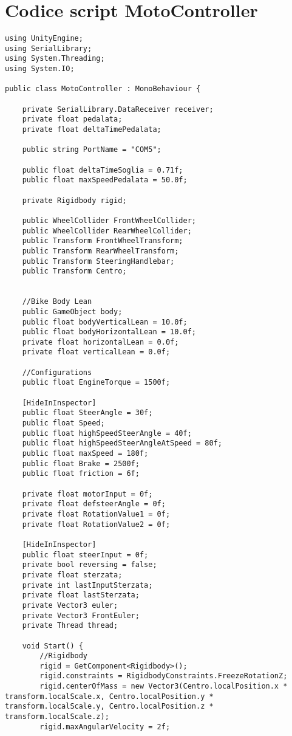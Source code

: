 \chapter{Codice script MotoController}
\label{controller}
\thispagestyle{empty}

\begin{lstlisting}
using UnityEngine;
using SerialLibrary;
using System.Threading;
using System.IO;

public class MotoController : MonoBehaviour {

    private SerialLibrary.DataReceiver receiver;
    private float pedalata;
    private float deltaTimePedalata;

    public string PortName = "COM5";
    
    public float deltaTimeSoglia = 0.71f;
    public float maxSpeedPedalata = 50.0f;

    private Rigidbody rigid;

    public WheelCollider FrontWheelCollider;
    public WheelCollider RearWheelCollider;
    public Transform FrontWheelTransform;
    public Transform RearWheelTransform;
	public Transform SteeringHandlebar;
    public Transform Centro;


    //Bike Body Lean
    public GameObject body;
    public float bodyVerticalLean = 10.0f;
    public float bodyHorizontalLean = 10.0f;
    private float horizontalLean = 0.0f;
    private float verticalLean = 0.0f;

    //Configurations
    public float EngineTorque = 1500f;

	[HideInInspector]
    public float SteerAngle = 30f;
    public float Speed;
    public float highSpeedSteerAngle = 40f;
    public float highSpeedSteerAngleAtSpeed = 80f;
    public float maxSpeed = 180f;
    public float Brake = 2500f;
    public float friction = 6f;

    private float motorInput = 0f;
    private float defsteerAngle = 0f;
    private float RotationValue1 = 0f;
    private float RotationValue2 = 0f;
	
	[HideInInspector]
    public float steerInput = 0f;
    private bool reversing = false;
    private float sterzata;
    private int lastInputSterzata;
    private float lastSterzata; 
    private Vector3 euler;
    private Vector3 FrontEuler;
    private Thread thread;

    void Start() {
        //Rigidbody
        rigid = GetComponent<Rigidbody>();
        rigid.constraints = RigidbodyConstraints.FreezeRotationZ;
        rigid.centerOfMass = new Vector3(Centro.localPosition.x * transform.localScale.x, Centro.localPosition.y * transform.localScale.y, Centro.localPosition.z * transform.localScale.z);
        rigid.maxAngularVelocity = 2f;
        

\end{lstlisting}
